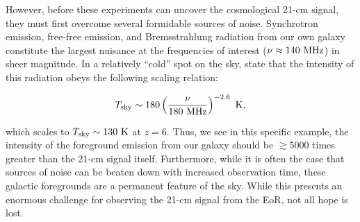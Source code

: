 However, before these experiments can uncover the cosmological 21-cm signal, they must first overcome several formidable sources of noise. Synchrotron emission, free-free emission, and Bremsstrahlung radiation from our own galaxy constitute the largest nuisance at the frequencies of interest ($\nu \approx 140\mhz$) in sheer magnitude. In a relatively ``cold'' spot on the sky, \citet{Furlanetto2006} state that the intensity of this radiation obeys the following scaling relation:

\begin{align}
T_{\text{sky}} \sim 180 \left( \dfrac{\nu}{180\mhz} \right)^{-2.6}\kelvin, \label{eq:Tsky}
\end{align}

which scales to $T_{\text{sky}} \sim 130\kelvin$ at $z = 6$. Thus, we see in this specific example, the intensity of the foreground emission from our galaxy should be $\gtrsim 5000$ times greater than the 21-cm signal itself. Furthermore, while it is often the case that sources of noise can be beaten down with increased observation time, these galactic foregrounds are a permanent feature of the sky.  While this presents an enormous challenge for observing the 21-cm signal from the EoR, not all hope is lost. 


